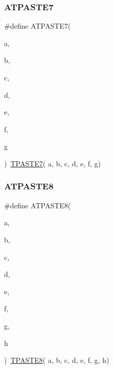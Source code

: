 \subsubsection{\texorpdfstring{ATPASTE7}{ATPASTE7}}
{\footnotesize\ttfamily \#define A\+T\+P\+A\+S\+T\+E7(\begin{DoxyParamCaption}\item[{}]{a,  }\item[{}]{b,  }\item[{}]{c,  }\item[{}]{d,  }\item[{}]{e,  }\item[{}]{f,  }\item[{}]{g }\end{DoxyParamCaption})~\mbox{\hyperlink{group__group__sam0__utils__tpaste_gad36c0d6224338a4f8738aa25659afc14}{T\+P\+A\+S\+T\+E7}}( a, b, c, d, e, f, g)}

\mbox{\label{group__group__sam0__utils__tpaste_ga303651436fcc8283bd17c13578476c8e}} 
\subsubsection{\texorpdfstring{ATPASTE8}{ATPASTE8}}
{\footnotesize\ttfamily \#define A\+T\+P\+A\+S\+T\+E8(\begin{DoxyParamCaption}\item[{}]{a,  }\item[{}]{b,  }\item[{}]{c,  }\item[{}]{d,  }\item[{}]{e,  }\item[{}]{f,  }\item[{}]{g,  }\item[{}]{h }\end{DoxyParamCaption})~\mbox{\hyperlink{group__group__sam0__utils__tpaste_gaf7aff743d5c0d66a81a13268b1a7e222}{T\+P\+A\+S\+T\+E8}}( a, b, c, d, e, f, g, h)}

\mbox{\label{group__group__sam0__utils__tpaste_ga5305e79258b2256febfac6ebec8838c2}} 
